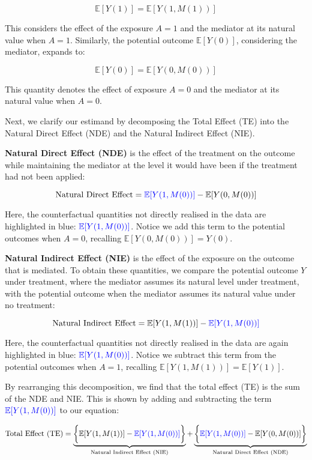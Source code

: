 \documentclass[
  single column]{article}
\begin{document}
\[ 
\mathbb{E}[Y(1)] = \mathbb{E}[Y(1, M(1))]
\]

This considers the effect of the exposure \(A = 1\) and the mediator at
its natural value when \(A = 1\). Similarly, the potential outcome
\(\mathbb{E}[Y(0)]\), considering the mediator, expands to:

\[ 
\mathbb{E}[Y(0)] = \mathbb{E}[Y(0, M(0))]
\]

This quantity denotes the effect of exposure \(A = 0\) and the mediator
at its natural value when \(A = 0\).

Next, we clarify our estimand by decomposing the Total Effect (TE) into
the Natural Direct Effect (NDE) and the Natural Indirect Effect (NIE).

\textbf{Natural Direct Effect (NDE)} is the effect of the treatment on
the outcome while maintaining the mediator at the level it would have
been if the treatment had not been applied:

\[
\text{Natural Direct Effect} = \textcolor{blue}{\mathbb{E}[Y(1, M(0))]} - \mathbb{E}[Y(0, M(0))]
\]

Here, the counterfactual quantities not directly realised in the data
are highlighted in blue: \(\textcolor{blue}{\mathbb{E}[Y(1, M(0))]}\).
Notice we add this term to the potential outcomes when \(A = 0\),
recalling \(\mathbb{E}[Y(0, M(0))] = Y(0)\).

\textbf{Natural Indirect Effect (NIE)} is the effect of the exposure on
the outcome that is mediated. To obtain these quantities, we compare the
potential outcome \(Y\) under treatment, where the mediator assumes its
natural level under treatment, with the potential outcome when the
mediator assumes its natural value under no treatment:

\[
\text{Natural Indirect Effect} = \mathbb{E}[Y(1, M(1))] - \textcolor{blue}{\mathbb{E}[Y(1, M(0))]}
\]

Here, the counterfactual quantities not directly realised in the data
are again highlighted in blue:
\(\textcolor{blue}{\mathbb{E}[Y(1, M(0))]}\). Notice we subtract this
term from the potential outcomes when \(A = 1\), recalling
\(\mathbb{E}[Y(1, M(1))] = \mathbb{E}[Y(1)]\).

By rearranging this decomposition, we find that the total effect (TE) is
the sum of the NDE and NIE. This is shown by adding and subtracting the
term \(\textcolor{blue}{\mathbb{E}[Y(1, M(0))]}\) to our equation:

\[
\text{Total Effect (TE)} = \underbrace{\bigg\{\mathbb{E}[Y(1, M(1))] - \textcolor{blue}{\mathbb{E}[Y(1, M(0))]}\bigg\}}_{\text{Natural Indirect Effect (NIE)}} + \underbrace{\bigg\{\textcolor{blue}{\mathbb{E}[Y(1, M(0))]} - \mathbb{E}[Y(0, M(0))]\bigg\}}_{\text{Natural Direct Effect (NDE)}}
\]
\end{document}

